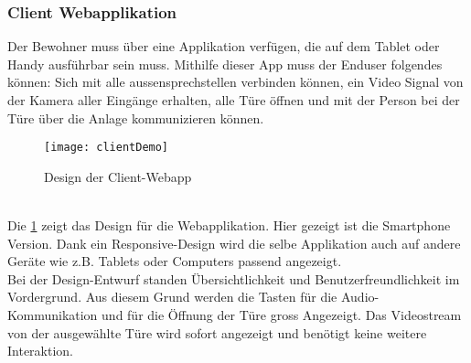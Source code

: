 \subsubsection{Client Webapplikation}
Der Bewohner muss über eine Applikation verfügen, die auf dem Tablet oder Handy ausführbar sein muss. Mithilfe dieser App muss der Enduser folgendes können: Sich mit alle \gls{aussensprechstelle}n verbinden können, ein Video Signal von der Kamera aller Eingänge erhalten, alle Türe öffnen und mit der Person bei der Türe über die Anlage kommunizieren können.
\\
\begin{figure}[htb!]
	\begin{center}
		\texttt{[image: clientDemo]}
		\caption[Design der Client-Webapp]{Design der Client-Webapp}
		\label{fig:clientDemo}
	\end{center}
\end{figure}
\\
Die \cref{fig:clientDemo} zeigt das Design für die Webapplikation. Hier gezeigt ist die Smartphone Version. Dank ein Responsive-Design wird die selbe Applikation auch auf andere Geräte wie z.B. Tablets oder Computers passend angezeigt.
\\ 
Bei der Design-Entwurf standen Übersichtlichkeit und Benutzerfreundlichkeit im Vordergrund. Aus diesem Grund werden die Tasten für die Audio-Kommunikation und für die Öffnung der Türe gross Angezeigt. Das Videostream von der ausgewählte Türe wird sofort angezeigt und benötigt keine weitere Interaktion. 

